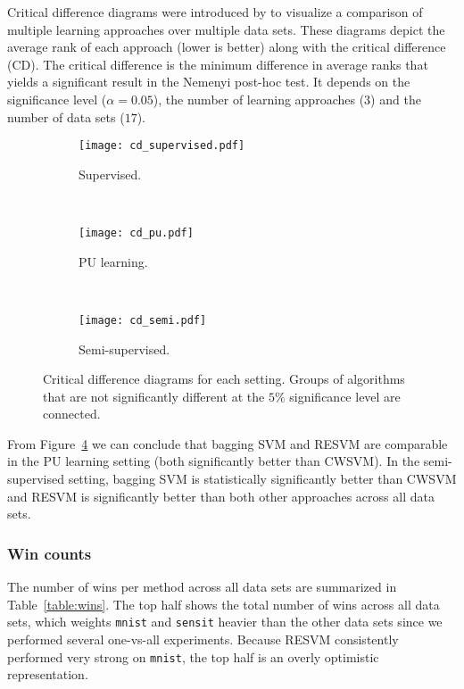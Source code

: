 \documentclass[preprint,elsarticle-num,12pt]{elsarticle}
\begin{document}
Critical difference diagrams were introduced by \citet{demvsar2006statistical} to visualize a comparison of multiple learning approaches over multiple data sets. These diagrams depict the average rank of each approach (lower is better) along with the critical difference (CD). The critical difference is the minimum difference in average ranks that yields a significant result in the Nemenyi post-hoc test. It depends on the significance level ($\alpha=0.05$), the number of learning approaches ($3$) and the number of data sets ($17$). 

\begin{figure}[!ht]
  \centering
  \begin{subfigure}[b]{0.43\textwidth}
		\texttt{[image: cd\_supervised.pdf]}
		\caption{Supervised.} \label{fig:cd_supervised}
  \end{subfigure}
  ~
  \begin{subfigure}[b]{0.43\textwidth}
	  \texttt{[image: cd\_pu.pdf]}
		\caption{PU learning.} \label{fig:cd_pu}
  \end{subfigure}
  ~
  \begin{subfigure}[b]{0.43\textwidth}
	  \texttt{[image: cd\_semi.pdf]}
		\caption{Semi-supervised.} \label{fig:cd_semi}
  \end{subfigure}
  \caption{Critical difference diagrams for each setting. %
      Groups of algorithms that are not significantly different at the $5\%$ significance level are connected.}%
  \label{fig:cds}
\end{figure}

From Figure~\ref{fig:cds} we can conclude that bagging SVM and RESVM are comparable in the PU learning setting (both significantly better than CWSVM). In the semi-supervised setting, bagging SVM is statistically significantly better than CWSVM and RESVM is significantly better than both other approaches across all data sets.

\subsubsection{Win counts} \label{wins}
The number of wins per method across all data sets are summarized in Table~\ref{table:wins}. The top half shows the total number of wins across all data sets, which weights \texttt{mnist} and \texttt{sensit} heavier than the other data sets since we performed several one-vs-all experiments. Because RESVM consistently performed very strong on \texttt{mnist}, the top half is an overly optimistic representation.
\end{document}
